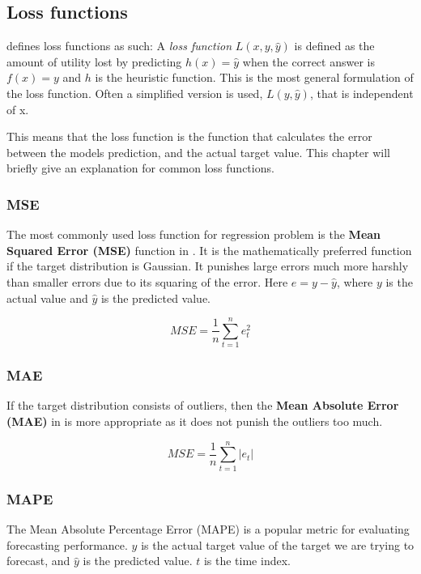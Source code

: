 \subsection{Loss functions}
\label{section:BT:Loss}
\cite[p. 710-711]{Russel2012} defines loss functions as such:
A \textit{loss function} $L(x, y, \hat{y})$ is defined as the amount of utility lost by predicting
$h(x)=\hat{y}$ when the correct answer is $f(x) = y$ and $h$ is the heuristic function.
This is the most general formulation of the loss function. Often a simplified version is used,
$L(y, \hat{y})$, that is independent of x.

This means that the loss function is the function that calculates the error between the
models prediction, and the actual target value.
This chapter will briefly give an explanation for common loss functions.


\subsubsection{MSE}
The most commonly used loss function for regression problem is the
\textbf{Mean Squared Error (MSE)} function in .
It is the mathematically preferred function if the target distribution is Gaussian.
It punishes large errors much more harshly than smaller errors due to its squaring of the error.
Here $e = y - \hat{y}$, where $y$ is the actual value and $\hat{y}$ is the predicted value.

\begin{equation}
  \label{eq:mean-squared-error}
  MSE = \frac{1}{n} \sum_{t=1}^n e_t^2
\end{equation}

\subsubsection{MAE}
If the target distribution consists of outliers, then the
\textbf{Mean Absolute Error (MAE)} in  is more appropriate
as it does not punish the outliers too much.

\begin{equation}
  \label{eq:mean-absolute-error}
  MSE = \frac{1}{n} \sum_{t=1}^n |e_t|
\end{equation}

\subsubsection{MAPE}
The Mean Absolute Percentage Error  (MAPE) is a popular metric for evaluating forecasting performance.
$y$ is the actual target value of the target we are trying to forecast, and $\hat{y}$ is the predicted value.
$t$ is the time index.

